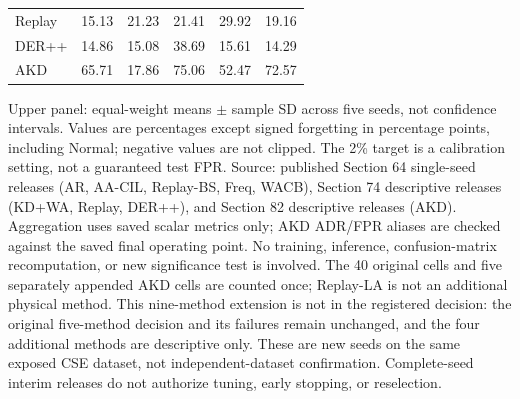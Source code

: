 \begin{table}[t]
\begin{tabular}{lrrrrr}
Replay & 15.13 & 21.23 & 21.41 & 29.92 & 19.16 \\
DER++ & 14.86 & 15.08 & 38.69 & 15.61 & 14.29 \\
AKD & 65.71 & 17.86 & 75.06 & 52.47 & 72.57 \\
\bottomrule
\end{tabular}
\par\smallskip\begin{minipage}{.97\textwidth}\footnotesize
Upper panel: equal-weight means $\pm$ sample SD across five seeds, not confidence intervals. Values are percentages except signed forgetting in percentage points, including Normal; negative values are not clipped. The 2\% target is a calibration setting, not a guaranteed test FPR. Source: published Section 64 single-seed releases (AR, AA-CIL, Replay-BS, Freq, WACB), Section 74 descriptive releases (KD+WA, Replay, DER++), and Section 82 descriptive releases (AKD). Aggregation uses saved scalar metrics only; AKD ADR/FPR aliases are checked against the saved final operating point. No training, inference, confusion-matrix recomputation, or new significance test is involved. The 40 original cells and five separately appended AKD cells are counted once; Replay-LA is not an additional physical method. This nine-method extension is not in the registered decision: the original five-method decision and its failures remain unchanged, and the four additional methods are descriptive only. These are new seeds on the same exposed CSE dataset, not independent-dataset confirmation. Complete-seed interim releases do not authorize tuning, early stopping, or reselection.
\end{minipage}
\end{table}

